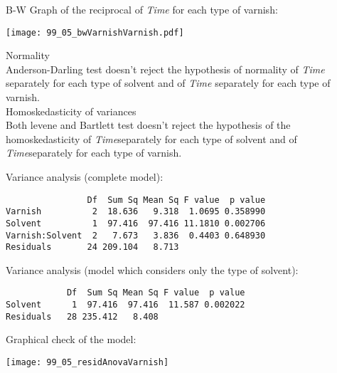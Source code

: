 \begin{frame}
  B-W Graph of the reciprocal of \textit{Time} for each type of varnish:\\
  \vspace{-0.5cm}
  \begin{center}
    \texttt{[image: 99\_05\_bwVarnishVarnish.pdf]}
  \end{center}
\end{frame}

\begin{frame}
  Normality\\
  \vspace*{0.25cm}
  Anderson-Darling test doesn't reject the hypothesis of normality of \textit{Time} separately for each type of solvent and of \textit{Time} separately for each type of varnish.\\
  \vspace{1cm}
  Homoskedasticity of variances\\
  \vspace*{0.25cm}
  Both levene and Bartlett test doesn't reject the hypothesis of the homoskedasticity of \textit{Time}separately for each type of solvent and of \textit{Time}separately for each type of varnish.\\    
\end{frame}

\begin{frame}[fragile]
  \vspace{0.25cm}
  Variance analysis (complete model):
  \begin{verbatim}  
                Df  Sum Sq Mean Sq F value  p value   
Varnish          2  18.636   9.318  1.0695 0.358990   
Solvent          1  97.416  97.416 11.1810 0.002706
Varnish:Solvent  2   7.673   3.836  0.4403 0.648930   
Residuals       24 209.104   8.713  
  \end{verbatim}
  \vspace{0.25cm}
  Variance analysis (model which considers only the type of solvent):
  \begin{verbatim}  
            Df  Sum Sq Mean Sq F value  p value
Solvent      1  97.416  97.416  11.587 0.002022
Residuals   28 235.412   8.408      
  \end{verbatim}
\end{frame}

\begin{frame}
   Graphical check of the model:\\
  \vspace{.1cm}
  \begin{center}
    \texttt{[image: 99\_05\_residAnovaVarnish]}
    \end{center}
\end{frame}
